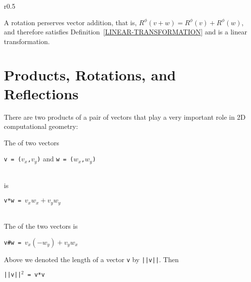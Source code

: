 \documentclass[12pt]{article}
\begin{document}
\begin{minipage}{\textwidth}\raggedright
\begin{wrapfigure}[5]{r}{0.5\textwidth}
\end{wrapfigure}
A rotation perserves vector addition, that is,
$R^\phi(v+w)=R^\phi(v)+R^\phi(w)$, and therefore
satisfies Definition~\ref{LINEAR-TRANSFORMATION}
and is a linear transformation.
\end{minipage}

\newpage

\section{Products, Rotations, and Reflections}
There are two products of a pair of vectors that play a
very important role in 2D computational geometry:

\begin{definition}
The  of two vectors \\
\centerline{{\tt v = ($v_x$,$v_y$)} and {\tt w = ($w_x$,$w_y$)}} \\
is \\
\centerline{\tt v*w = $v_x w_x + v_y w_y$} \\
The  of the two vectors is \\
\centerline{\tt v\#w = $v_x(-w_y) + v_y w_x$}
\end{definition}

Above we denoted the length of a vector {\tt v} by {\tt ||v||}.
Then \\
\centerline{\tt ||v||$^2$ = v*v}
\end{document}
